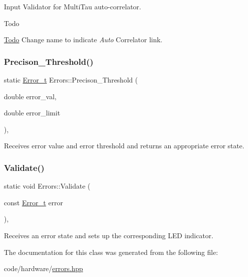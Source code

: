 Input Validator for Multi\+Tau auto-\/correlator. 

\begin{DoxyRefDesc}{Todo}
\item[\hyperlink{todo__todo000001}{Todo}]Change name to indicate {\itshape Auto} Correlator link. \end{DoxyRefDesc}
\mbox{\label{classErrors_a1568635c69e70e2422a5a632d8d6809d}} 
\subsubsection{\texorpdfstring{Precison\+\_\+\+Threshold()}{Precison\_Threshold()}}
{\footnotesize\ttfamily static \hyperlink{errors_8hpp_a4e8c0d09726859e3d3369c0da5a1aa7f}{Error\+\_\+t} Errors\+::\+Precison\+\_\+\+Threshold (\begin{DoxyParamCaption}\item[{double}]{error\+\_\+val,  }\item[{double}]{error\+\_\+limit }\end{DoxyParamCaption})\hspace{0.3cm}{\ttfamily [inline]}, {\ttfamily [static]}}



Receives error value and error threshold and returns an appropriate error state. 

\mbox{\label{classErrors_a9e43e14a2d0834f192b954cce71c387b}} 
\subsubsection{\texorpdfstring{Validate()}{Validate()}}
{\footnotesize\ttfamily static void Errors\+::\+Validate (\begin{DoxyParamCaption}\item[{const \hyperlink{errors_8hpp_a4e8c0d09726859e3d3369c0da5a1aa7f}{Error\+\_\+t}}]{error }\end{DoxyParamCaption})\hspace{0.3cm}{\ttfamily [inline]}, {\ttfamily [static]}}



Receives an error state and sets up the corresponding L\+ED indicator. 



The documentation for this class was generated from the following file\+:\begin{DoxyCompactItemize}
\item 
code/hardware/\hyperlink{errors_8hpp}{errors.\+hpp}\end{DoxyCompactItemize}
